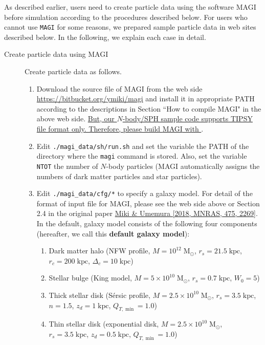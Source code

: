 \label{s3sec:NbodySPH_MAGI_usage}
As described earlier, users need to create particle data using the software \textsc{MAGI} before simulation according to the procedures described below. For users who cannot use \texttt{MAGI} for some reasons, we prepared sample particle data in web sites described below. In the following, we explain each case in detail.
\begin{description}
\item[Create particle data using \textsc{MAGI}] Create particle data as follows.
\begin{enumerate}
\item Download the source file of \textsc{MAGI} from the web side \href{https://bitbucket.org/ymiki/magi}{https://bitbucket.org{\slash}ymiki{\slash}magi} and install it in appropriate PATH according to the descriptions in Section ``How to compile MAGI" in the above web side. \ul{But, our {$N$}-body/SPH sample code supports TIPSY file format only. Therefore, please build {\textsc{MAGI}} with {}}.
\item Edit \texttt{./magi\_data/sh/run.sh} and set the variable  the PATH of the directory where the \texttt{magi} command is stored. Also, set the variable \texttt{NTOT} the number of $N$-body particles (\textsc{MAGI} automatically assigns the numbers of dark matter particles and star particles).
\item Edit \texttt{./magi\_data/cfg/*} to specify a galaxy model. For detail of the format of input file for \textsc{MAGI}, please see the web side above or Section 2.4 in the original paper \href{https://doi.org/10.1093/mnras/stx3327}{Miki \& Umemura [2018, MNRAS, 475, 2269]}. In the default, galaxy model consists of the following four components (hereafter, we call this \textbf{default galaxy model}):
\begin{enumerate}[label=(\roman*)]
\item Dark matter halo (NFW profile, $M=10^{12}\;\mathrm{M_{\odot}}$, $r_{s}=21.5\;\mathrm{kpc}$, $r_{c}=200\;\mathrm{kpc}$, $\Delta_{c}=10\;\mathrm{kpc}$)
\item Stellar bulge (King model, $M=5\times 10^{10}\;\mathrm{M_{\odot}}$, $r_{s}=0.7\;\mathrm{kpc}$, $W_{0}=5$)
\item Thick stellar disk  (S{\'e}rsic profile, $M=2.5\times 10^{10}\;\mathrm{M_{\odot}}$, $r_{s}=3.5\;\mathrm{kpc}$, $n=1.5$, $z_{d}=1\;\mathrm{kpc}$, $Q_{T,\min}=1.0$)
\item Thin stellar disk (exponential disk, $M=2.5\times 10^{10}\;\mathrm{M_{\odot}}$, $r_{s}=3.5\;\mathrm{kpc}$, $z_{d}=0.5\;\mathrm{kpc}$, $Q_{T,\min}=1.0$)

\end{enumerate}
\end{enumerate}
\end{description}
